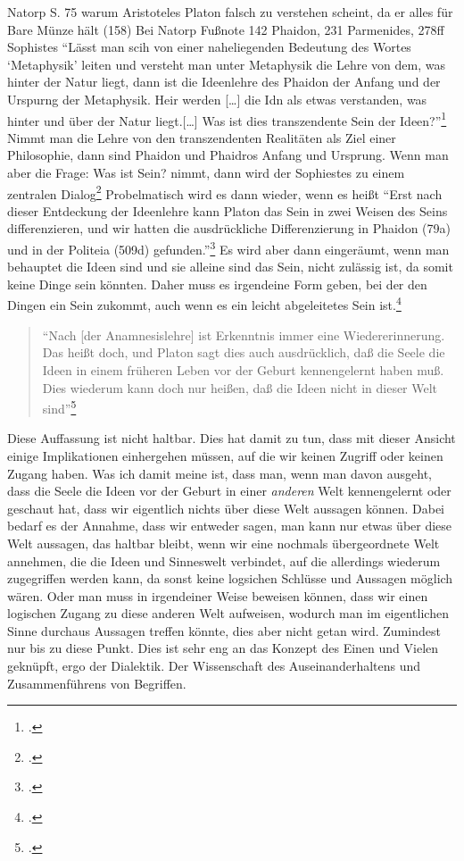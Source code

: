 \documentclass[12pt]{article}
\newcommand*{\zitatblock}[1]{%
    \begin{quote}
    \fontsize{10}{12}\selectfont
    \setlength{\parskip}{1.0em}
    #1
    \end{quote}
}
\begin{document}
Natorp S. 75 warum Aristoteles Platon falsch zu verstehen scheint, da er alles für Bare Münze hält (158) Bei Natorp Fußnote 142 Phaidon, 231 Parmenides, 278ff Sophistes
\enquote{Lässt man scih von einer naheliegenden Bedeutung des Wortes \enquote{Metaphysik} leiten und versteht man unter Metaphysik die Lehre von dem, was hinter der Natur liegt, dann ist die Ideenlehre des Phaidon der Anfang und der Urspurng der Metaphysik. Heir werden [\dots] die Idn als etwas verstanden, was hinter und über der Natur liegt.[\dots] Was ist dies transzendente Sein der Ideen?}\footcite[vgl.][S. 128]{Martin73}
Nimmt man die Lehre von den transzendenten Realitäten als Ziel einer Philosophie, dann sind Phaidon und Phaidros Anfang und Ursprung. Wenn man aber die Frage: Was ist Sein? nimmt, dann wird der Sophiestes zu einem zentralen Dialog\footcite[vgl.][S. 129]{Martin73}
Probelmatisch wird es dann wieder, wenn es heißt \enquote{Erst nach dieser Entdeckung der Ideenlehre kann Platon das Sein in zwei Weisen des Seins differenzieren, und wir hatten die ausdrückliche Differenzierung in Phaidon (79a) und in der Politeia (509d) gefunden.}\footcite[][S. 131]{Martin73}
Es wird aber dann eingeräumt, wenn man behauptet die Ideen sind und sie alleine sind das Sein, nicht zulässig ist, da somit keine Dinge sein könnten. Daher muss es irgendeine Form geben, bei der den Dingen ein Sein zukommt, auch wenn es ein leicht abgeleitetes Sein ist.\footcite[vlg.][S. 131]{Martin73}
\zitatblock{\enquote{Nach [der Anamnesislehre] ist Erkenntnis immer eine Wiedererinnerung. Das heißt doch, und Platon sagt dies auch ausdrücklich, daß die Seele die Ideen in einem früheren Leben vor der Geburt kennengelernt haben muß. Dies wiederum kann doch nur heißen, daß die Ideen nicht in dieser Welt sind}\footcite[][S. 160]{Martin73}}
Diese Auffassung ist nicht haltbar. Dies hat damit zu tun, dass mit dieser Ansicht einige Implikationen einhergehen müssen, auf die wir keinen Zugriff oder keinen Zugang haben. Was ich damit meine ist, dass man, wenn man davon ausgeht, dass die Seele die Ideen vor der Geburt in einer \emph{anderen} Welt kennengelernt oder geschaut hat, dass wir eigentlich nichts über diese Welt aussagen können. Dabei bedarf es der Annahme, dass wir entweder sagen, man kann nur etwas über diese Welt aussagen, das haltbar bleibt, wenn wir eine nochmals übergeordnete Welt annehmen, die die Ideen und Sinneswelt verbindet, auf die allerdings wiederum zugegriffen werden kann, da sonst keine logsichen Schlüsse und Aussagen möglich wären. Oder man muss in irgendeiner Weise beweisen können, dass wir einen logischen Zugang zu diese anderen Welt aufweisen, wodurch man im eigentlichen Sinne durchaus Aussagen treffen könnte, dies aber nicht getan wird. Zumindest nur bis zu diese Punkt.
Dies ist sehr eng an das Konzept des Einen und Vielen geknüpft, ergo der Dialektik. Der Wissenschaft des Auseinanderhaltens und Zusammenführens von Begriffen.
\end{document}
